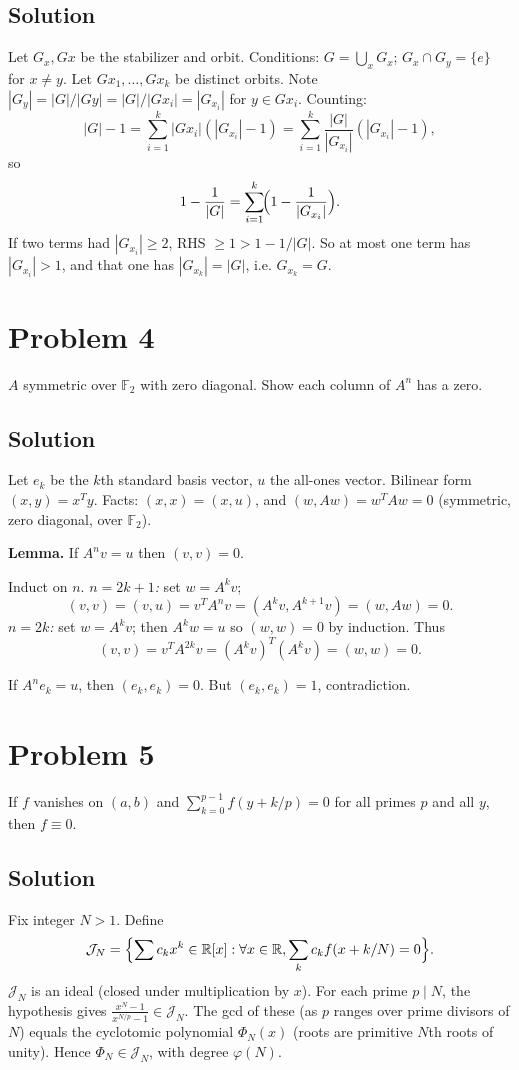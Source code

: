 \documentclass{article}
\begin{document}
\subsection*{Solution}
Let $G_x, Gx$ be the stabilizer and orbit. Conditions: $G = \bigcup_x G_x$; $G_x \cap G_y = \{e\}$ for $x \ne y$. Let $Gx_1, \ldots, Gx_k$ be distinct orbits. Note $|G_y| = |G|/|Gy| = |G|/|Gx_i| = |G_{x_i}|$ for $y \in Gx_i$. Counting:
\[
|G| - 1 = \sum_{i=1}^k |Gx_i|(|G_{x_i}| - 1) = \sum_{i=1}^k \frac{|G|}{|G_{x_i}|}(|G_{x_i}| - 1),
\]
so
\[
1 - \frac{1}{|G|} = \sum_{i=1}^k\!\Bigl(1 - \frac{1}{|G_{x_i}|}\Bigr).
\]
If two terms had $|G_{x_i}| \ge 2$, RHS $\ge 1 > 1 - 1/|G|$. So at most one term has $|G_{x_i}| > 1$, and that one has $|G_{x_k}| = |G|$, i.e. $G_{x_k} = G$.

\section*{Problem 4}
$A$ symmetric over $\mathbb{F}_2$ with zero diagonal. Show each column of $A^n$ has a zero.

\subsection*{Solution}
Let $e_k$ be the $k$th standard basis vector, $u$ the all-ones vector. Bilinear form $(x,y) = x^T y$. Facts: $(x,x) = (x,u)$, and $(w, Aw) = w^T A w = 0$ (symmetric, zero diagonal, over $\mathbb{F}_2$).

\textbf{Lemma.} If $A^n v = u$ then $(v, v) = 0$.

Induct on $n$. \emph{$n = 2k+1$:} set $w = A^k v$;
\[
(v,v) = (v, u) = v^T A^n v = (A^k v, A^{k+1} v) = (w, Aw) = 0.
\]
\emph{$n = 2k$:} set $w = A^k v$; then $A^k w = u$ so $(w,w) = 0$ by induction. Thus
\[
(v,v) = v^T A^{2k} v = (A^k v)^T (A^k v) = (w,w) = 0.
\]

If $A^n e_k = u$, then $(e_k, e_k) = 0$. But $(e_k, e_k) = 1$, contradiction.

\section*{Problem 5}
If $f$ vanishes on $(a,b)$ and $\sum_{k=0}^{p-1} f(y + k/p) = 0$ for all primes $p$ and all $y$, then $f \equiv 0$.

\subsection*{Solution}
Fix integer $N > 1$. Define
\[
\mathcal J_N = \Bigl\{ \sum c_k x^k \in \mathbb{R}[x] : \forall x \in \mathbb{R}, \sum_k c_k f(x + k/N) = 0 \Bigr\}.
\]
$\mathcal J_N$ is an ideal (closed under multiplication by $x$). For each prime $p \mid N$, the hypothesis gives $\tfrac{x^N - 1}{x^{N/p} - 1} \in \mathcal J_N$. The gcd of these (as $p$ ranges over prime divisors of $N$) equals the cyclotomic polynomial $\Phi_N(x)$ (roots are primitive $N$th roots of unity). Hence $\Phi_N \in \mathcal J_N$, with degree $\varphi(N)$.
\end{document}
